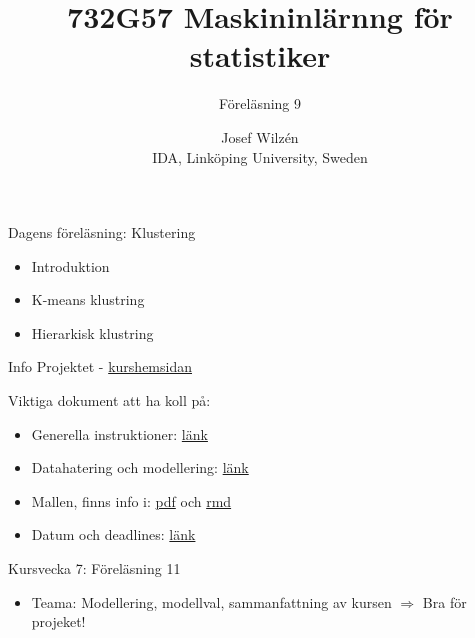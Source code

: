 \documentclass[10pt,english]{beamer}
\title{732G57 Maskininlärnng för statistiker}
\subtitle{Föreläsning 9}
\date{}
\author{Josef Wilzén \\ IDA, Linköping University, Sweden}
\begin{document}
\maketitle

\begin{frame}{Dagens föreläsning: Klustering}

    \begin{itemize}
        \item Introduktion
        \item K-means klustring
        \item Hierarkisk klustring
    \end{itemize}
    
\end{frame}


% 
% 


\begin{frame}{Info}
  Projektet - \href{https://www.ida.liu.se/~732G57/info/courseinfo.sv.shtml\#projekt}{kurshemsidan}

  Viktiga dokument att ha koll på:
    \begin{itemize}
        \item Generella instruktioner: \href{https://raw.githubusercontent.com/STIMALiU/732G57_ML/refs/heads/main/project/projekt_2026.pdf}{länk}
        \item Datahatering och modellering: \href{https://raw.githubusercontent.com/STIMALiU/732G57_ML/refs/heads/main/project/Projekt\%20modellering.pdf}{länk}
        \item Mallen, finns info i: \href{https://raw.githubusercontent.com/STIMALiU/732G57_ML/refs/heads/main/project/template/Rapportmall-STIMA-projekt.pdf}{pdf} och
                                     \href{https://raw.githubusercontent.com/STIMALiU/732G57_ML/refs/heads/main/project/template/Rapportmall\%20STIMA\%20projekt.rmd}{rmd}
        \item Datum och deadlines: \href{https://raw.githubusercontent.com/STIMALiU/732G57_ML/refs/heads/main/project/Datum_ht2026.pdf}{länk}
    \end{itemize}
  Kursvecka 7: Föreläsning 11
      \begin{itemize}
        \item Teama: Modellering, modellval, sammanfattning av kursen $\Rightarrow$ Bra för projeket!
    \end{itemize}

\end{frame}
\end{document}
